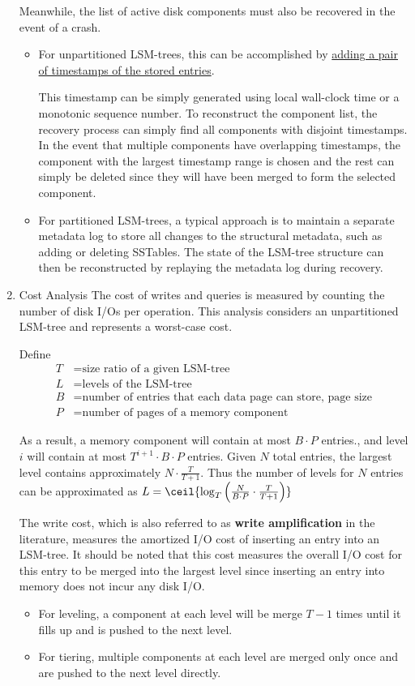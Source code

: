 \documentclass[11pt]{article}
\begin{document}
\begin{enumerate}
Meanwhile, the list of active disk components must also be recovered in the event of a crash.
\begin{itemize}
\item For unpartitioned LSM-trees, this can be accomplished by \uline{adding a pair of timestamps of the stored
entries}.

This timestamp can be simply generated using local wall-clock time or a monotonic sequence number.
To reconstruct the component list, the recovery process can simply find all components with disjoint
timestamps. In the event that multiple components have overlapping timestamps, the component with
the largest timestamp range is chosen and the rest can simply be deleted since they will have been
merged to form the selected component.
\item For partitioned LSM-trees, a typical approach is to maintain a separate metadata log to store all
changes to the structural metadata, such as adding or deleting SSTables. The state of the LSM-tree
structure can then be reconstructed by replaying the metadata log during recovery.
\end{itemize}
\item Cost Analysis
\label{sec:org0c0253b}
The cost of writes and queries is measured by counting the number of disk I/Os per operation. This
analysis considers an unpartitioned LSM-tree and represents a worst-case cost.

Define
\begin{align*}
T&=\text{size ratio of a given LSM-tree}\\
L&=\text{levels of the LSM-tree}\\
B&=\text{number of entries that each data page can store, page size}\\
P&=\text{number of pages of a memory component}
\end{align*}

As a result, a memory component will contain at most \(B\cdot P\) entries., and level \(i\) will
contain at most \(T^{i+1}\cdot B\cdot P\) entries. Given \(N\) total entries, the largest level
contains approximately \(N\cdot\frac{T}{T+1}\). Thus the number of levels for \(N\) entries can be
approximated as \(L=\ceil{\log_T\left(\frac{N}{B\cdot P}\cdot\frac{T}{T+1}\right)}\)

The write cost, which is also referred to as \textbf{write amplification} in the literature, measures the
amortized I/O cost of inserting an entry into an LSM-tree. It should be noted that this cost measures
the overall I/O cost for this entry to be merged into the largest level since inserting an entry into
memory does not incur any disk I/O.
\begin{itemize}
\item For leveling, a component at each level will be merge \(T-1\) times until it fills up and is pushed
to the next level.
\item For tiering, multiple components at each level are merged only once and are pushed to the next level
directly.
\end{itemize}


\end{enumerate}
\end{document}
